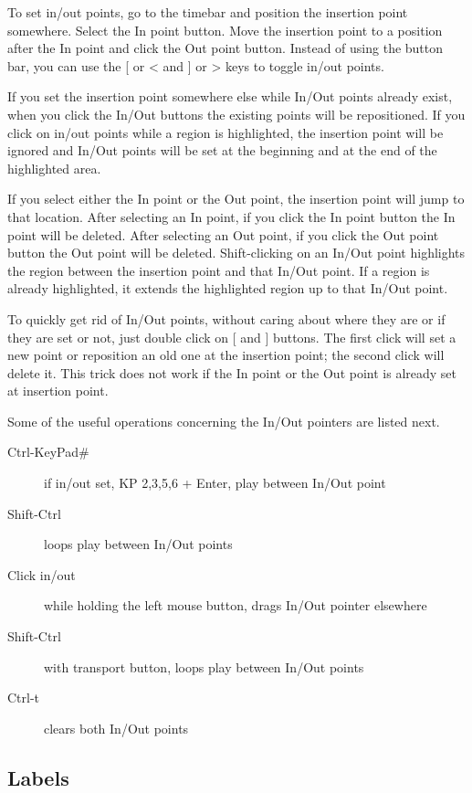 To set in/out points, go to the timebar and position the insertion point somewhere. 
Select the In point button. 
Move the insertion point to a position after the In point and click the Out point button. 
Instead of using the button bar, you can use the [ or < and ] or > keys to toggle in/out points.

If you set the insertion point somewhere else while In/Out points already exist, when you click the In/Out buttons the existing points will be repositioned. 
If you click on in/out points while a region is highlighted, the insertion point will be ignored and In/Out points will be set at the beginning and at the end of the highlighted area.

If you select either the In point or the Out point, the insertion point will jump to that location. 
After selecting an In point, if you click the In point button the In point will be deleted. 
After selecting an Out point, if you click the Out point button the Out point will be deleted. 
Shift-clicking on an In/Out point highlights the region between the insertion point and that In/Out point. 
If a region is already highlighted, it extends the highlighted region up to that In/Out point.

To quickly get rid of In/Out points, without caring about where they are or if they are set or not, just double click on [ and ] buttons. 
The first click will set a new point or reposition an old one at the insertion point; the second click will delete it. This trick does not work if the In point or the Out point is already set at insertion point.

Some of the useful operations concerning the In/Out pointers are listed next.

\begin{description}
    \item[Ctrl-KeyPad\#]  if in/out set, KP 2,3,5,6 + Enter, play between In/Out point
    \item[Shift-Ctrl]  loops play between In/Out points
    \item[Click in/out] while holding the left mouse button, drags In/Out pointer elsewhere
    \item[Shift-Ctrl] with transport button, loops play between In/Out points
    \item[Ctrl-t]  clears both In/Out points
\end{description}

\subsection{Labels}%
\label{sub:labels}

